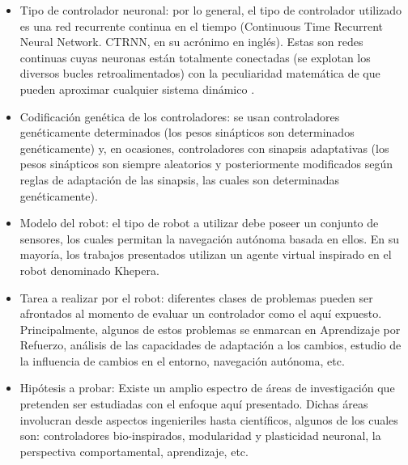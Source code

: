 \begin{itemize}
  \item{Tipo de controlador neuronal: por lo general, el tipo de controlador utilizado es una red recurrente continua en el tiempo (Continuous Time Recurrent Neural Network. CTRNN, en su acrónimo en inglés). Estas son redes continuas cuyas neuronas están totalmente conectadas (se explotan los diversos bucles retroalimentados) con la peculiaridad matemática de que pueden aproximar cualquier sistema dinámico \cite{FunaYNaka}.}
  \item{Codificación genética de los controladores: se usan controladores genéticamente determinados (los pesos sinápticos son determinados genéticamente) y, en ocasiones, controladores con sinapsis adaptativas (los pesos sinápticos son siempre aleatorios y posteriormente modificados según reglas de adaptación de las sinapsis, las cuales son determinadas genéticamente).}
  \item{Modelo del robot: el tipo de robot a utilizar debe poseer un conjunto de sensores, los cuales permitan la navegación autónoma basada en ellos. En su mayoría, los trabajos presentados utilizan un agente virtual inspirado en el robot denominado Khepera.}
  \item{Tarea a realizar por el robot: diferentes clases de problemas pueden ser afrontados al momento de evaluar un controlador como el aquí expuesto. Principalmente, algunos de estos problemas se enmarcan en Aprendizaje por Refuerzo, análisis de las capacidades de adaptación a los cambios, estudio de la influencia de cambios en el entorno, navegación autónoma, etc. }
  \item{Hipótesis a probar: Existe un amplio espectro de áreas de investigación que pretenden ser estudiadas con el enfoque aquí presentado. Dichas áreas involucran desde aspectos ingenieriles hasta científicos\cite{Nolfi}, algunos de los cuales son: controladores bio-inspirados, modularidad y plasticidad neuronal, la perspectiva comportamental, aprendizaje, etc.}
\end{itemize}

